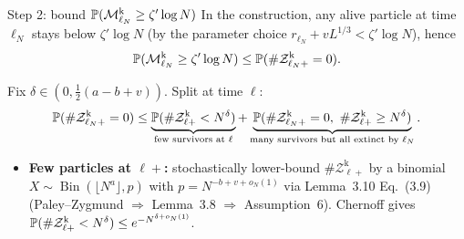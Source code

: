 \begin{block}{Step 2: bound $\P(\mathcal M^{\mathrm k}_{\ell_N}\ge \zeta'\log N)$}
In the construction, any alive particle at time $\ell_N$ stays below $\zeta'\log N$ (by the parameter choice $r_{\ell_N}+vL^{1/3}<\zeta'\log N$), hence
\[
    \P(\mathcal M^{\mathrm k}_{\ell_N}\ge \zeta'\log N)
    \le
    \P(\#\mathcal Z^{\mathrm k}_{\ell_N+}=0).
\]
\end{block}
\vspace{-1mm}
Fix $\delta\in(0,\tfrac12(a-b+v))$. Split at time $\ell$:
\[
    \P(\#\mathcal Z^{\mathrm k}_{\ell_N+}=0)
    \le
    \underbrace{\P(\#\mathcal Z^{\mathrm k}_{\ell+}<N^\delta)}_{\text{few survivors at }\ell}
    +
    \underbrace{\P(\#\mathcal Z^{\mathrm k}_{\ell_N+}=0,\ \#\mathcal Z^{\mathrm k}_{\ell+}\ge N^\delta)}_{\text{many survivors but all extinct by }\ell_N}.
\]
\vspace{-1mm}
\begin{itemize}
    \item \textbf{Few particles at $\ell+$:} stochastically lower-bound $\#\mathcal Z^{\mathrm k}_{\ell+}$ by a binomial $X\sim\operatorname{Bin}(\lfloor N^a\rfloor,p)$ with $p=N^{-b+v+o_N(1)}$ via {\color{blue!60!black}Lemma~3.10 Eq.~(3.9) (Paley--Zygmund $\Rightarrow$ Lemma~3.8 $\Rightarrow$ Assumption~6)}.  Chernoff gives $\P(\#\mathcal Z^{\mathrm k}_{\ell+}<N^\delta)\le e^{-N^{\delta+o_N(1)}}$.
\end{itemize}
